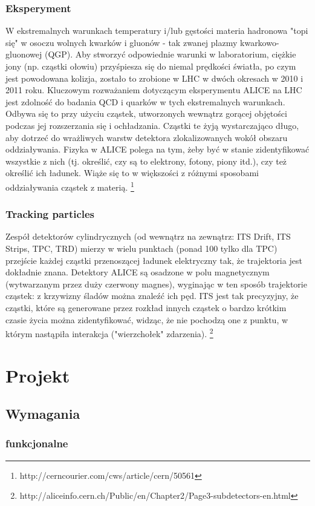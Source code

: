 \subsubsection{Eksperyment}
W ekstremalnych warunkach temperatury i/lub gęstości materia hadronowa "topi się" w osoczu wolnych kwarków i gluonów - tak zwanej plazmy kwarkowo-gluonowej (QGP). Aby stworzyć odpowiednie warunki w laboratorium, ciężkie jony (np. cząstki ołowiu) przyśpiesza się do niemal prędkości światła, po czym jest powodowana kolizja, zostało to zrobione w LHC w dwóch okresach w 2010 i 2011 roku. Kluczowym rozważaniem dotyczącym eksperymentu ALICE na LHC jest zdolność do badania QCD i quarków w tych ekstremalnych warunkach. Odbywa się to przy użyciu cząstek, utworzonych wewnątrz gorącej objętości podczas jej rozszerzania się i ochładzania. Cząstki te żyją wystarczająco długo, aby dotrzeć do wrażliwych warstw detektora zlokalizowanych wokół obszaru oddziaływania. Fizyka w ALICE polega na tym, żeby być w stanie zidentyfikować wszystkie z nich (tj. określić, czy są to elektrony, fotony, piony itd.), czy też określić ich ładunek. Wiąże się to w większości z różnymi sposobami oddziaływania cząstek z materią. \footnote{http://cerncourier.com/cws/article/cern/50561}
\subsubsection{Tracking particles}
Zespół detektorów cylindrycznych (od wewnątrz na zewnątrz: ITS Drift, ITS Strips, TPC, TRD) mierzy w wielu punktach (ponad 100 tylko dla TPC) przejście każdej cząstki przenoszącej ładunek elektryczny tak, że trajektoria jest dokładnie znana. Detektory ALICE są osadzone w polu magnetycznym (wytwarzanym przez duży czerwony magnes), wyginając w ten sposób trajektorie cząstek: z krzywizny śladów można znaleźć ich pęd. ITS jest tak precyzyjny, że cząstki, które są generowane przez rozkład innych cząstek o bardzo krótkim czasie życia można zidentyfikować, widząc, że nie pochodzą one z punktu, w którym nastąpiła interakcja ("wierzchołek" zdarzenia).
\footnote{http://aliceinfo.cern.ch/Public/en/Chapter2/Page3-subdetectors-en.html}

\newpage
\section{Projekt}
\subsection{Wymagania}
\subsubsection{funkcjonalne}
